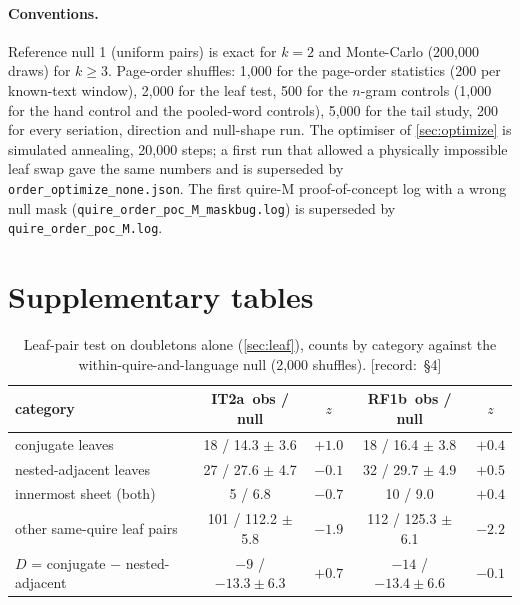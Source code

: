 \documentclass[11pt,a4paper]{article}
\newcommand{\src}[1]{{\footnotesize\color{muted}\sffamily\mbox{[record: \S#1]}}}
\newcommand{\Dstat}{D}
\newcommand{\IT}{\textcolor{it2a}{IT2a}}
\newcommand{\RF}{\textcolor{rf1b}{RF1b}}
\begin{document}
\paragraph{Conventions.} Reference null 1 (uniform pairs) is exact for $k=2$ and Monte-Carlo (200,000 draws) for $k\ge3$. Page-order shuffles: 1,000 for the page-order statistics (200 per known-text window), 2,000 for the leaf test, 500 for the $n$-gram controls (1,000 for the hand control and the pooled-word controls), 5,000 for the tail study, 200 for every seriation, direction and null-shape run. The optimiser of \cref{sec:optimize} is simulated annealing, 20,000 steps; a first run that allowed a physically impossible leaf swap gave the same numbers and is superseded by \texttt{order\_optimize\_none.json}. The first quire-M proof-of-concept log with a wrong null mask (\texttt{quire\_order\_poc\_M\_maskbug.log}) is superseded by \texttt{quire\_order\_poc\_M.log}.

\section{Supplementary tables}
\label{app:tables}

\begin{table}[H]
\centering\small
\caption{Leaf-pair test on doubletons alone (\cref{sec:leaf}), counts by category against the within-quire-and-language null (2,000 shuffles). \src{4}}
\begin{tabular}{@{}lcccc@{}}
\toprule
category & \IT\ obs / null & $z$ & \RF\ obs / null & $z$\\
\midrule
conjugate leaves & 18 / 14.3 $\pm$ 3.6 & $+1.0$ & 18 / 16.4 $\pm$ 3.8 & $+0.4$\\
nested-adjacent leaves & 27 / 27.6 $\pm$ 4.7 & $-0.1$ & 32 / 29.7 $\pm$ 4.9 & $+0.5$\\
innermost sheet (both) & 5 / 6.8 & $-0.7$ & 10 / 9.0 & $+0.4$\\
other same-quire leaf pairs & 101 / 112.2 $\pm$ 5.8 & $-1.9$ & 112 / 125.3 $\pm$ 6.1 & $-2.2$\\
$\Dstat$ = conjugate $-$ nested-adjacent & $-9$ / $-13.3 \pm 6.3$ & $\mathbf{+0.7}$ & $-14$ / $-13.4 \pm 6.6$ & $\mathbf{-0.1}$\\
\bottomrule
\end{tabular}
\end{table}
\end{document}
